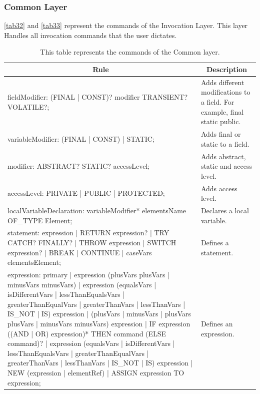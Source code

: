 \subsubsection{Common Layer}
\autoref{tab32} and \autoref{tab33} represent the commands of the Invocation Layer.  This layer Handles all invocation commands that the user dictates.

\begin{table}[H]
	\centering
	\begin{tabular}{|p{8cm}|p{7cm}|}
		\hline
		\multicolumn{1}{|c|}{{\bf Rule}}                                                                                                                                                                                                                                                                                                                                                                                                      & \multicolumn{1}{c|}{{\bf Description}} \\ \hline
		fieldModifier: (FINAL | CONST)? modifier TRANSIENT? VOLATILE?; & Adds different modifications to a field. For example, final static public. \\ \hline
		variableModifier: (FINAL | CONST) | STATIC; & Adds final or static to a field. \\ \hline
		modifier: ABSTRACT? STATIC? accessLevel; & Adds abstract, static and access level. \\ \hline
		accessLevel: PRIVATE | PUBLIC | PROTECTED; & Adds access level. \\ \hline
		localVariableDeclaration: variableModifier* elementsName OF\_TYPE Element; & Declares a local variable. \\ \hline
		statement: expression | RETURN expression? | TRY CATCH? FINALLY? | THROW expression | SWITCH expression? | BREAK | CONTINUE | caseVars elementsElement; & Defines a statement. \\ \hline
		expression: primary | expression (plusVars plusVars | minusVars minusVars) | expression (equalsVars | isDifferentVars | lessThanEqualsVars | greaterThanEqualVars | greaterThanVars | lessThanVars | IS\_NOT | IS) expression | (plusVars | minusVars | plusVars plusVars | minusVars minusVars) expression | IF expression ((AND | OR) expression)* THEN command (ELSE command)? | expression (equalsVars | isDifferentVars | lessThanEqualsVars | greaterThanEqualVars | greaterThanVars | lessThanVars | IS\_NOT | IS) expression | NEW (expression | elementRef) | ASSIGN expression TO expression; & Defines an expression. \\ \hline
	\end{tabular}
		\caption{This table represents the commands of the Common layer.}
		\label{tab32}
\end{table}

